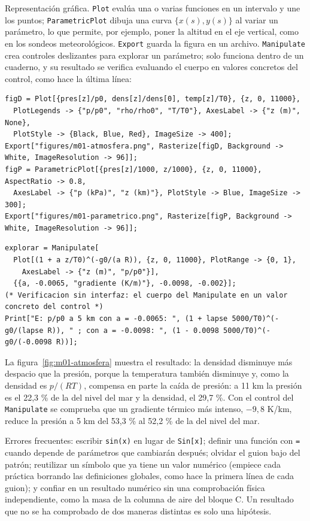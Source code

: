 \documentclass[10pt,openany]{book}
\begin{document}
Representación gráfica. \texttt{Plot} evalúa una o varias funciones en un intervalo y une los puntos; \texttt{ParametricPlot} dibuja una curva \(\{x(s), y(s)\}\) al variar un parámetro, lo que permite, por ejemplo, poner la altitud en el eje vertical, como en los sondeos meteorológicos. \texttt{Export} guarda la figura en un archivo. \texttt{Manipulate} crea controles deslizantes para explorar un parámetro; solo funciona dentro de un cuaderno, y su resultado se verifica evaluando el cuerpo en valores concretos del control, como hace la última línea:
\begin{lstlisting}[style=studium]
figD = Plot[{pres[z]/p0, dens[z]/dens[0], temp[z]/T0}, {z, 0, 11000},
  PlotLegends -> {"p/p0", "rho/rho0", "T/T0"}, AxesLabel -> {"z (m)", None},
  PlotStyle -> {Black, Blue, Red}, ImageSize -> 400];
Export["figures/m01-atmosfera.png", Rasterize[figD, Background -> White, ImageResolution -> 96]];
figP = ParametricPlot[{pres[z]/1000, z/1000}, {z, 0, 11000}, AspectRatio -> 0.8,
  AxesLabel -> {"p (kPa)", "z (km)"}, PlotStyle -> Blue, ImageSize -> 300];
Export["figures/m01-parametrico.png", Rasterize[figP, Background -> White, ImageResolution -> 96]];
\end{lstlisting}
\begin{lstlisting}[style=studium]
explorar = Manipulate[
  Plot[(1 + a z/T0)^(-g0/(a R)), {z, 0, 11000}, PlotRange -> {0, 1},
    AxesLabel -> {"z (m)", "p/p0"}],
  {{a, -0.0065, "gradiente (K/m)"}, -0.0098, -0.002}];
(* Verificacion sin interfaz: el cuerpo del Manipulate en un valor concreto del control *)
Print["E: p/p0 a 5 km con a = -0.0065: ", (1 + lapse 5000/T0)^(-g0/(lapse R)), " ; con a = -0.0098: ", (1 - 0.0098 5000/T0)^(-g0/(-0.0098 R))];
\end{lstlisting}
La figura~\ref{fig:m01-atmosfera} muestra el resultado: la densidad disminuye más despacio que la presión, porque la temperatura también disminuye y, como la densidad es \(p/(RT)\), compensa en parte la caída de presión: a 11 km la presión es el 22,3 \% de la del nivel del mar y la densidad, el 29,7 \%. Con el control del \texttt{Manipulate} se comprueba que un gradiente térmico más intenso, \(-9{,}8\) K/km, reduce la presión a 5 km del 53,3 \% al 52,2 \% de la del nivel del mar.

\begin{tcolorbox}[title={Consejo}, studiumtip, breakable]

Errores frecuentes: escribir \texttt{sin(x)} en lugar de \texttt{Sin[x]}; definir una función con \texttt{=} cuando depende de parámetros que cambiarán después; olvidar el guion bajo del patrón; reutilizar un símbolo que ya tiene un valor numérico (empiece cada práctica borrando las definiciones globales, como hace la primera línea de cada guion); y confiar en un resultado numérico sin una comprobación física independiente, como la masa de la columna de aire del bloque C. Un resultado que no se ha comprobado de dos maneras distintas es solo una hipótesis.
\end{tcolorbox}
\end{document}
